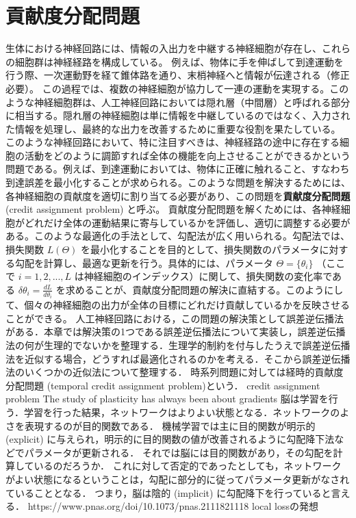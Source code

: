 \section{貢献度分配問題}
生体における神経回路には、情報の入出力を中継する神経細胞が存在し、これらの細胞群は神経経路を構成している。
例えば、物体に手を伸ばして到達運動を行う際、一次運動野を経て錐体路を通り、末梢神経へと情報が伝達される（修正必要）。
この過程では、複数の神経細胞が協力して一連の運動を実現する。このような神経細胞群は、人工神経回路においては隠れ層（中間層）と呼ばれる部分に相当する。隠れ層の神経細胞は単に情報を中継しているのではなく、入力された情報を処理し、最終的な出力を改善するために重要な役割を果たしている。
このような神経回路において、特に注目すべきは、神経経路の途中に存在する細胞の活動をどのように調節すれば全体の機能を向上させることができるかという問題である。例えば、到達運動においては、物体に正確に触れること、すなわち到達誤差を最小化することが求められる。このような問題を解決するためには、各神経細胞の貢献度を適切に割り当てる必要があり、この問題を\textbf{貢献度分配問題} (credit assignment problem) と呼ぶ。
貢献度分配問題を解くためには、各神経細胞がどれだけ全体の運動結果に寄与しているかを評価し、適切に調整する必要がある。このような最適化の手法として、勾配法が広く用いられる。勾配法では、損失関数 \( L(\Theta) \) を最小化することを目的として、損失関数のパラメータに対する勾配を計算し、最適な更新を行う。具体的には、パラメータ \( \Theta = \{\theta_i\} \) （ここで \( i = 1, 2, ..., L \) は神経細胞のインデックス）に関して、損失関数の変化率である \( \delta\theta_i = \frac{dL}{d\theta_i} \) を求めることが、貢献度分配問題の解決に直結する。このようにして、個々の神経細胞の出力が全体の目標にどれだけ貢献しているかを反映させることができる。
人工神経回路における，この問題の解決策として誤差逆伝播法がある．本章では解決策の1つである誤差逆伝播法について実装し，誤差逆伝播法の何が生理的でないかを整理する．生理学的制約を付与したうえで誤差逆伝播法を近似する場合，どうすれば最適化されるのかを考える．そこから誤差逆伝播法のいくつかの近似法について整理する．
時系列問題に対しては経時的貢献度分配問題 (temporal credit assignment problem)という．
credit assignment problem 
The study of plasticity has always been about gradients
脳は学習を行う．学習を行った結果，ネットワークはよりよい状態となる．ネットワークのよさを表現するのが目的関数である．
機械学習では主に目的関数が明示的 (explicit) に与えられ，明示的に目的関数の値が改善されるように勾配降下法などでパラメータが更新される．
それでは脳には目的関数があり，その勾配を計算しているのだろうか．
これに対して否定的であったとしても，ネットワークがよい状態になるということは，勾配に部分的に従ってパラメータ更新がなされていることとなる．
つまり，脳は陰的 (implicit) に勾配降下を行っていると言える．
https://www.pnas.org/doi/10.1073/pnas.2111821118
local lossの発想
